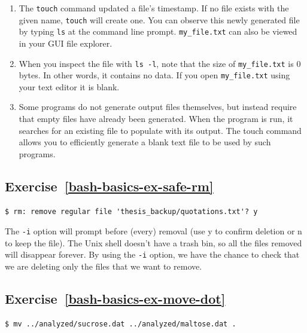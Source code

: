 \documentclass[
]{krantz}
\begin{document}
\begin{enumerate}
\def\labelenumi{\arabic{enumi}.}
\item
  The \texttt{touch} command updated a file's timestamp.
  If no file exists with the given name, \texttt{touch} will create one.
  You can observe this newly generated file by typing \texttt{ls} at the
  command line prompt. \texttt{my\_file.txt} can also be viewed in your
  GUI file explorer.
\item
  When you inspect the file with \texttt{ls\ -l}, note that the size of
  \texttt{my\_file.txt} is 0 bytes. In other words, it contains no data.
  If you open \texttt{my\_file.txt} using your text editor it is blank.
\item
  Some programs do not generate output files themselves, but
  instead require that empty files have already been generated.
  When the program is run, it searches for an existing file to
  populate with its output. The touch command allows you to
  efficiently generate a blank text file to be used by such
  programs.
\end{enumerate}

\hypertarget{exercise-refbash-basics-ex-safe-rm}{%
\subsection*{Exercise~\ref{bash-basics-ex-safe-rm}}\label{exercise-refbash-basics-ex-safe-rm}}


\begin{verbatim}
$ rm: remove regular file 'thesis_backup/quotations.txt'? y
\end{verbatim}

The \texttt{-i} option will prompt before (every) removal
(use y to confirm deletion or n to keep the file).
The Unix shell doesn't have a trash bin, so all the files removed will disappear forever.
By using the \texttt{-i} option, we have the chance to check that we are deleting
only the files that we want to remove.

\hypertarget{exercise-refbash-basics-ex-move-dot}{%
\subsection*{Exercise~\ref{bash-basics-ex-move-dot}}\label{exercise-refbash-basics-ex-move-dot}}


\begin{verbatim}
$ mv ../analyzed/sucrose.dat ../analyzed/maltose.dat .
\end{verbatim}
\end{document}
